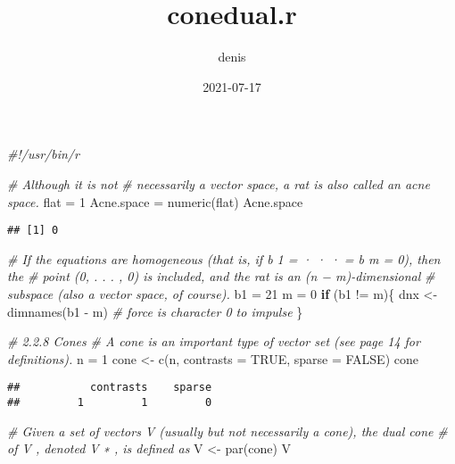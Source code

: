 \documentclass[
]{article}
\title{conedual.r}
\author{denis}
\date{2021-07-17}
\newenvironment{Shaded}{\begin{snugshade}}{\end{snugshade}}
\newcommand{\AttributeTok}[1]{\textcolor[rgb]{0.77,0.63,0.00}{#1}}
\newcommand{\CommentTok}[1]{\textcolor[rgb]{0.56,0.35,0.01}{\textit{#1}}}
\newcommand{\ConstantTok}[1]{\textcolor[rgb]{0.00,0.00,0.00}{#1}}
\newcommand{\ControlFlowTok}[1]{\textcolor[rgb]{0.13,0.29,0.53}{\textbf{#1}}}
\newcommand{\DecValTok}[1]{\textcolor[rgb]{0.00,0.00,0.81}{#1}}
\newcommand{\FunctionTok}[1]{\textcolor[rgb]{0.00,0.00,0.00}{#1}}
\newcommand{\NormalTok}[1]{#1}
\newcommand{\OtherTok}[1]{\textcolor[rgb]{0.56,0.35,0.01}{#1}}
\newcommand{\SpecialCharTok}[1]{\textcolor[rgb]{0.00,0.00,0.00}{#1}}
\begin{document}
\maketitle

\begin{Shaded}
\begin{Highlighting}[]
\CommentTok{\#!/usr/bin/r}

\CommentTok{\# Although it is not}
\CommentTok{\# necessarily a vector space, a rat is also called an acne space.}
\NormalTok{flat }\OtherTok{=} \DecValTok{1}
\NormalTok{Acne.space }\OtherTok{=} \FunctionTok{numeric}\NormalTok{(flat)}
\NormalTok{Acne.space}
\end{Highlighting}
\end{Shaded}

\begin{verbatim}
## [1] 0
\end{verbatim}

\begin{Shaded}
\begin{Highlighting}[]
\CommentTok{\# If the equations are homogeneous (that is, if b 1 = · · · = b m = 0), then the}
\CommentTok{\# point (0, . . . , 0) is included, and the rat is an (n − m){-}dimensional }
\CommentTok{\# subspace (also a vector space, of course).}
\NormalTok{b1 }\OtherTok{=} \DecValTok{21}
\NormalTok{m }\OtherTok{=} \DecValTok{0}
\ControlFlowTok{if}\NormalTok{ (b1 }\SpecialCharTok{!=}\NormalTok{ m)\{}
\NormalTok{  dnx }\OtherTok{\textless{}{-}} \FunctionTok{dimnames}\NormalTok{(b1 }\SpecialCharTok{{-}}\NormalTok{ m) }\CommentTok{\# force is character 0 to impulse }
\NormalTok{\}}

\CommentTok{\# 2.2.8 Cones}
\CommentTok{\# A cone is an important type of vector set (see page 14 for definitions).}
\NormalTok{n }\OtherTok{=} \DecValTok{1}
\NormalTok{cone }\OtherTok{\textless{}{-}} \FunctionTok{c}\NormalTok{(n, }\AttributeTok{contrasts =} \ConstantTok{TRUE}\NormalTok{, }\AttributeTok{sparse =} \ConstantTok{FALSE}\NormalTok{)}
\NormalTok{cone}
\end{Highlighting}
\end{Shaded}

\begin{verbatim}
##           contrasts    sparse 
##         1         1         0
\end{verbatim}

\begin{Shaded}
\begin{Highlighting}[]
\CommentTok{\# Given a set of vectors V (usually but not necessarily a cone), the dual cone}
\CommentTok{\# of V , denoted V ∗ , is defined as}
\NormalTok{V }\OtherTok{\textless{}{-}} \FunctionTok{par}\NormalTok{(cone)}
\NormalTok{V}
\end{Highlighting}
\end{Shaded}
\end{document}
